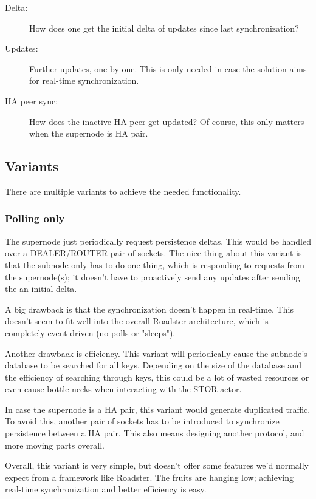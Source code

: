 \begin{description}
	\item [Delta:]
		How does one get the initial delta of updates since last
		synchronization?

	\item [Updates:]
		Further updates, one-by-one. This is only needed in
		case the solution aims for real-time synchronization.

	\item [HA peer sync:]
		How does the inactive HA peer get updated? Of
		course, this only matters when the supernode is HA pair.
\end{description}

\subsection{Variants}
There are multiple variants to achieve the needed functionality.

\subsubsection{Polling only}
The supernode just periodically request persistence
deltas. This would be handled over a DEALER/ROUTER pair of sockets. The nice
thing about this variant is that the subnode only has to do one thing, which is
responding to requests from the supernode(s); it doesn't have to proactively
send any updates after sending the an initial delta.

A big drawback is that the synchronization doesn't happen in real-time. This
doesn't seem to fit well into the overall Roadster architecture, which is
completely event-driven (no polls or "sleeps").

Another drawback is efficiency. This variant will periodically cause the
subnode's database to be searched for all keys. Depending on the size of the
database and the efficiency of searching through keys, this could be a lot of
wasted resources or even cause bottle necks when interacting with the STOR
actor.

In case the supernode is a HA pair, this variant would generate duplicated
traffic. To avoid this, another pair of sockets has to be introduced to
synchronize persistence between a HA pair. This also means designing another
protocol, and more moving parts overall.

Overall, this variant is very simple, but doesn't offer some features we'd
normally expect from a framework like Roadster. The fruits are hanging low;
achieving real-time synchronization and better efficiency is easy.


